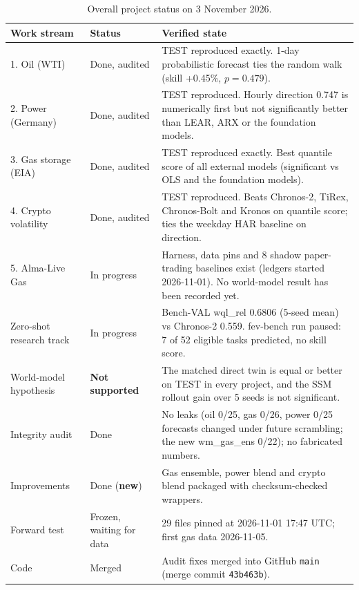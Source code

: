 \documentclass[10pt,a4paper]{article}
\newcommand{\new}[1]{\textcolor{almaorange}{\textbf{#1}}}
\begin{document}
\begin{table}[H]
\centering\small
\caption{Overall project status on 3 November 2026.}
\label{tab:glance}
\begin{tabularx}{\linewidth}{@{}p{3.6cm}p{2.6cm}X@{}}
\toprule
Work stream & Status & Verified state\\
\midrule
1. Oil (WTI) & Done, audited & TEST reproduced exactly. 1-day probabilistic forecast ties the random walk (skill +0.45\%, $p=0.479$).\\
2. Power (Germany) & Done, audited & TEST reproduced. Hourly direction 0.747 is numerically first but not significantly better than LEAR, ARX or the foundation models.\\
3. Gas storage (EIA) & Done, audited & TEST reproduced exactly. Best quantile score of all external models (significant vs OLS and the foundation models).\\
4. Crypto volatility & Done, audited & TEST reproduced. Beats Chronos-2, TiRex, Chronos-Bolt and Kronos on quantile score; ties the weekday HAR baseline on direction.\\
5. Alma-Live Gas & In progress & Harness, data pins and 8 shadow paper-trading baselines exist (ledgers started 2026-11-01). No world-model result has been recorded yet.\\
Zero-shot research track & In progress & Bench-VAL wql\_rel 0.6806 (5-seed mean) vs Chronos-2 0.559. fev-bench run paused: 7 of 52 eligible tasks predicted, no skill score.\\
World-model hypothesis & \textbf{Not supported} & The matched direct twin is equal or better on TEST in every project, and the SSM rollout gain over 5 seeds is not significant.\\
Integrity audit & Done & No leaks (oil 0/25, gas 0/26, power 0/25 forecasts changed under future scrambling; the new wm\_gas\_ens 0/22); no fabricated numbers.\\
Improvements & Done (\new{new}) & Gas ensemble, power blend and crypto blend packaged with checksum-checked wrappers.\\
Forward test & Frozen, waiting for data & 29 files pinned at 2026-11-01 17:47 UTC; first gas data 2026-11-05.\\
Code & Merged & Audit fixes merged into GitHub \texttt{main} (merge commit \texttt{43b463b}).\\
\bottomrule
\end{tabularx}
\end{table}
\end{document}
